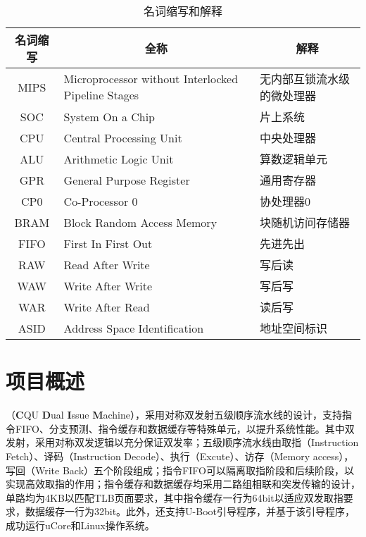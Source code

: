 \begin{table}[!htbp]
    \centering
    \caption{名词缩写和解释}
    \label{table:abbreviation_definition}
    
    \begin{tabular}{cll}
    \toprule
    \multicolumn{1}{c}{\textbf{名词缩写}} & \multicolumn{1}{c}{\textbf{全称}}                   & \multicolumn{1}{c}{\textbf{解释}} \\ 
    \midrule
    MIPS                               & Microprocessor without Interlocked Pipeline Stages & 无内部互锁流水级的微处理器 \\
    SOC                                & System On a Chip                                   & 片上系统 \\
    CPU                                & Central Processing Unit                            & 中央处理器 \\
    ALU                                & Arithmetic Logic Unit                              & 算数逻辑单元 \\
    GPR                                & General Purpose Register                           & 通用寄存器 \\
    CP0                                & Co-Processor 0                                     & 协处理器0 \\
    BRAM                               & Block Random Access Memory                         & 块随机访问存储器 \\
    FIFO                               & First In First Out                                 & 先进先出 \\
    RAW                                & Read After Write                                   & 写后读 \\
    WAW                                & Write After Write                                  & 写后写 \\
    WAR                                & Write After Read                                   & 读后写 \\
    ASID                               & Address Space Identification                       & 地址空间标识 \\
    \bottomrule
    \end{tabular}
\end{table}

\section{项目概述}
\cpuname（\textbf{C}QU \textbf{D}ual \textbf{I}ssue \textbf{M}achine），采用对称双发射五级顺序流水线的设计，支持指令FIFO、分支预测、指令缓存和数据缓存等特殊单元，以提升系统性能。其中双发射，采用对称双发逻辑以充分保证双发率；五级顺序流水线由取指（Instruction Fetch）、译码（Instruction Decode）、执行（Excute）、访存（Memory access），写回（Write Back）五个阶段组成；指令FIFO可以隔离取指阶段和后续阶段，以实现高效取指的作用；指令缓存和数据缓存均采用二路组相联和突发传输的设计，单路均为4KB以匹配TLB页面要求，其中指令缓存一行为64bit以适应双发取指要求，数据缓存一行为32bit。\todo 此外，\cpuname 还支持U-Boot引导程序，并基于该引导程序，成功运行uCore和Linux操作系统。
